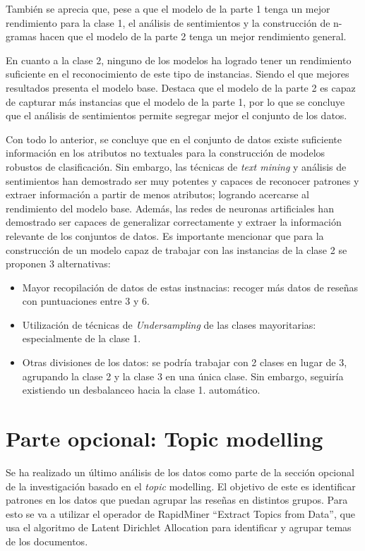 \documentclass[es]{uc3mreport}
\begin{document}
\begin{report}
También se aprecia que, pese a que el modelo de la parte 1 tenga un mejor
rendimiento para la clase 1, el análisis de sentimientos y la construcción de
n-gramas hacen que el modelo de la parte 2 tenga un mejor rendimiento general.

En cuanto a la clase 2, ninguno de los modelos ha logrado tener un rendimiento
suficiente en el reconocimiento de este tipo de instancias. Siendo el que
mejores resultados presenta el modelo base. Destaca que el modelo de la parte 2
es capaz de capturar más instancias que el modelo de la parte 1, por lo que se
concluye que el análisis de sentimientos permite segregar mejor el conjunto de
los datos.

Con todo lo anterior, se concluye que en el conjunto de datos existe suficiente
información en los atributos no textuales para la construcción de modelos
robustos de clasificación. Sin embargo, las técnicas de \textit{text mining} y
análisis de sentimientos han demostrado ser muy potentes y capaces de reconocer
patrones y extraer información a partir de menos atributos; logrando acercarse
al rendimiento del modelo base. Además, las redes de neuronas artificiales han
demostrado ser capaces de generalizar correctamente y extraer la información
relevante de los conjuntos de datos. Es importante mencionar que para la
construcción de un modelo capaz de trabajar con las instancias de la clase 2 se
proponen 3 alternativas:

\begin{itemize}
    \item Mayor recopilación de datos de estas instnacias: recoger más datos de
    reseñas con puntuaciones entre 3 y 6.
    \item Utilización de técnicas de \textit{Undersampling} de las clases
    mayoritarias: especialmente de la clase 1.
    \item Otras divisiones de los datos: se podría trabajar con 2 clases en
    lugar de 3, agrupando la clase 2 y la clase 3 en una única clase. Sin
    embargo, seguiría existiendo un desbalanceo hacia la clase 1.
    automático.
\end{itemize}

\section{Parte opcional: Topic modelling}
\label{chap:topic}

Se ha realizado un último análisis de los datos como parte de la sección
opcional de la investigación basado en el \textit{topic} modelling. El objetivo de este
es identificar patrones en los datos que puedan agrupar las reseñas en
distintos grupos. Para esto se va a utilizar el operador de RapidMiner “Extract
Topics from Data”, que usa el algoritmo de Latent Dirichlet Allocation para
identificar y agrupar temas de los documentos.


\end{report}
\end{document}
